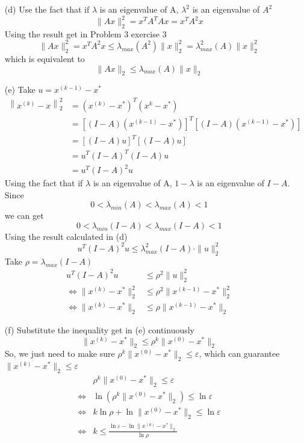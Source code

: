 \documentclass[a4paper,12pt]{article}
\begin{document}
\begin{enumerate}
\begin{itemize}
\begin{itemize}
\item[(d)]
Use the fact that if $\lambda$ is an eigenvalue of A, $\lambda^2$ is an eigenvalue of $A^2$
$$
\| Ax \|_2^2 = x^T A^T A x = x^T A^2 x
$$
Using the result get in Problem 3 exercise 3 
$$
\| Ax \|_2^2 = x^T A^2 x \le \lambda_{max} (A^2) \| x \|_2^2 = \lambda_{max}^2 (A) \| x \|_2^2
$$
which is equivalent to
$$
\| Ax \|_2 \le \lambda_{max} (A) \| x \|_2
$$

\item[(e)]
Take $u = x^{(k-1)} - x^*$
\begin{align*}
\left \| x^{(k)} - x \right \|_2^2 
&= (x^{(k)} - x^*)^T (x^{k} - x^*) \\
&= \left [(I - A) \left ( x^{(k-1)} - x^* \right ) \right ]^T \left [(I - A) \left ( x^{(k-1)} - x^* \right ) \right ] \\
&=  \left [(I - A) u \right ]^T \left [(I - A) u \right ]\\
&=  u^T (I - A)^T (I - A) u \\
&= u^T (I-A)^2 u
\end{align*}
Using the fact that if $\lambda$ is an eigenvalue of A, $1-\lambda$ is an eigenvalue of $I - A$. \\
Since 
$$0 < \lambda_{min}(A) < \lambda_{max}(A) < 1$$ 
we can get 
$$0 < \lambda_{min}(I - A) < \lambda_{max}(I - A) < 1$$
Using the result calculated in (d)
$$
 u^T (I-A)^2 u \le \lambda_{max}^2 (I - A) \cdot \| u \|_2^2
$$
Take $\rho = \lambda_{max} (I - A) $
\begin{align*}
 u^T (I-A)^2 u &\le \rho^2 \| u \|_2^2 \\
 \Longleftrightarrow \| x^{(k)} - x^* \|_2^2 &\le \rho^2  \| x^{(k-1)} - x^* \|_2^2 \\
 \Longleftrightarrow \| x^{(k)} - x^* \|_2 &\le \rho  \| x^{(k-1)} - x^* \|_2
\end{align*}

\item[(f)]
Substitute the inequality get in (e) continuously
$$
\| x^{(k)} - x^* \|_2 \le\rho^k \| x^{(0)} - x^* \|_2
$$
So, we just need to make sure $\rho^k \| x^{(0)} - x^* \|_2 \le \varepsilon$, which can guarantee $\| x^{(k)} - x^* \|_2 \le \varepsilon$
\begin{align*}
&\rho^k \| x^{(0)} - x^* \|_2 \le \varepsilon \\
\Longleftrightarrow& \ln \left ( \rho^k \| x^{(0)} - x^* \|_2 \right ) \le \ln \varepsilon \\
\Longleftrightarrow& k \ln \rho  +\ln  \| x^{(0)} - x^* \|_2 \le \ln \varepsilon \\
\Longleftrightarrow& k \le \frac{\ln \varepsilon -\ln  \| x^{(0)} - x^* \|_2 }{\ln \rho}
\end{align*}
\end{itemize}


\end{itemize}
\end{enumerate}
\end{document}
